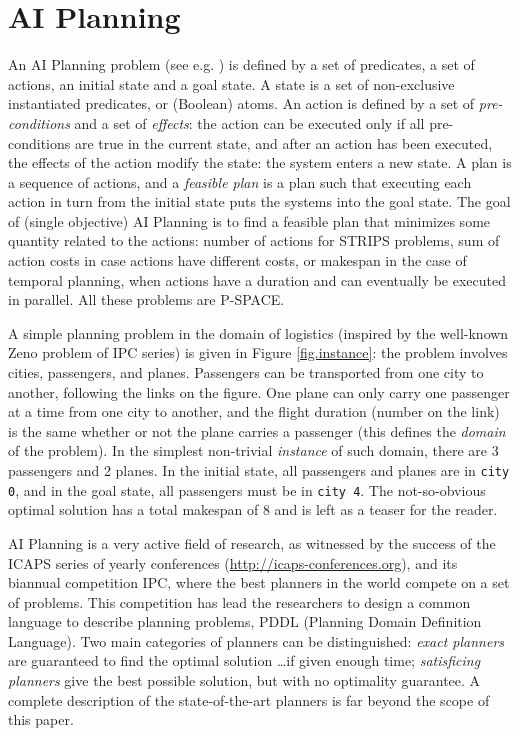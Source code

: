\documentclass{llncs}
\def\ZENO{{\sc Zeno}}
\begin{document}
\section{AI Planning}
\label{AIPlanning}

An AI Planning problem (see e.g. \cite{AIplanningBook2004}) is defined by a set of predicates, a set of actions, an initial state and a goal state. A state is a set of non-exclusive instantiated predicates, or (Boolean) atoms. An action is defined by a set of {\em pre-conditions} and a set of {\em effects}: the action can be executed only if all pre-conditions are true in the current state, and after an action has been executed, the effects of the action modify the state: the system enters a new state.
A plan is a sequence of actions, and a {\em feasible plan} is a plan such that executing each action in turn from the initial state puts the systems into the goal state. 
The goal of (single objective) AI Planning is to find a feasible plan that minimizes some quantity related to the actions: number of actions for STRIPS problems, sum of action costs in case actions have different costs, or makespan in the case of temporal planning, when actions have a duration and can eventually be executed in parallel. All these problems are P-SPACE.

A simple planning problem in the domain of logistics (inspired by the well-known {\ZENO} problem of IPC series) is given in Figure \ref{fig.instance}: the problem involves cities, passengers, and planes. Passengers can be transported from one city to another, following the links on the figure. One plane can only carry one passenger at a time from one city to another, and the flight duration (number on the link) is the same whether or not the plane carries a passenger (this defines the {\em domain} of the problem). In the simplest non-trivial {\em instance} of such domain, there are 3 passengers and 2 planes. In the initial state, all passengers and planes are in {\tt city 0}, and in the goal state, all passengers must be in {\tt city 4}. The not-so-obvious optimal solution has a total makespan of 8 and is left as a teaser for the reader.

AI Planning is a very active field of research, as witnessed by the success of the ICAPS series of yearly conferences (\url{http://icaps-conferences.org}), and its biannual competition IPC, where the best planners in the world compete on a set of problems. This competition has lead the researchers to design a common language to describe planning problems, PDDL (Planning Domain Definition Language). Two main categories of planners can be distinguished: {\em exact planners} are guaranteed to find the optimal solution \ldots if given enough time; {\em satisficing planners} give the best possible solution, but with no optimality guarantee. A complete description of the state-of-the-art planners is far beyond the scope of this paper. 
\end{document}
